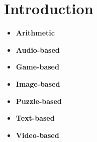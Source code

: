 \chapter{Introduction}
\begin{itemize}
\item{\textbf{Arithmetic}\\
}
\item{\textbf{Audio-based}\\
}
\item{\textbf{Game-based}\\
}
\item{\textbf{Image-based}\\
}
\item{\textbf{Puzzle-based}\\
}
\item{\textbf{Text-based}\\
}
\item{\textbf{Video-based}\\
}
\end{itemize}

